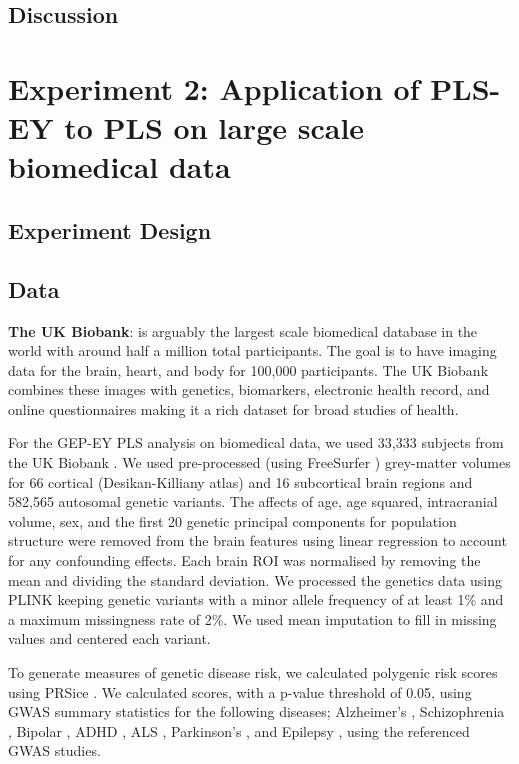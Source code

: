 \subsection{Discussion}



\section{Experiment 2: Application of PLS-EY to PLS on large scale biomedical data}

\subsection{Experiment Design}

\subsection{Data}
\textbf{The UK Biobank}: is arguably the largest scale biomedical database in the world with around half a
million
total participants. The goal is to have imaging data for the brain, heart, and body for 100,000 participants. The UK Biobank combines these images with genetics, biomarkers, electronic health record, and online questionnaires making it a rich dataset for broad studies of health.

For the GEP-EY PLS analysis on biomedical data, we used 33,333 subjects from the UK Biobank \citep{sudlow2015uk}. We used pre-processed (using FreeSurfer \citep{Fischl2012}) grey-matter volumes for 66 cortical (Desikan-Killiany atlas) and 16 subcortical brain regions and 582,565 autosomal genetic variants. The affects of age, age squared, intracranial volume, sex, and the first 20 genetic principal components for population structure were removed from the brain features using linear regression to account for any confounding effects. Each brain ROI was normalised by removing the mean and dividing the standard deviation. We processed the genetics data using PLINK \citep{Purcell2007} keeping genetic variants with a minor allele frequency of at least 1\%  and a maximum missingness rate of 2\%. We used mean imputation to fill in missing values and centered each variant.

To generate measures of genetic disease risk, we calculated polygenic risk scores using PRSice \citep{PRSice2014}. We calculated scores, with a p-value threshold of 0.05, using GWAS summary statistics for the following diseases; Alzheimer's \citep{Lambert2013}, Schizophrenia \citep{Trubetskoy2022}, Bipolar \citep{Mullins2021}, ADHD \citep{Demontis2023}, ALS \citep{Van_Rheenen2021}, Parkinson's \citep{Nalls2019}, and Epilepsy \citep{International_League_Against_Epilepsy_Consortium_on_Complex_Epilepsies2018}, using the referenced GWAS studies.

